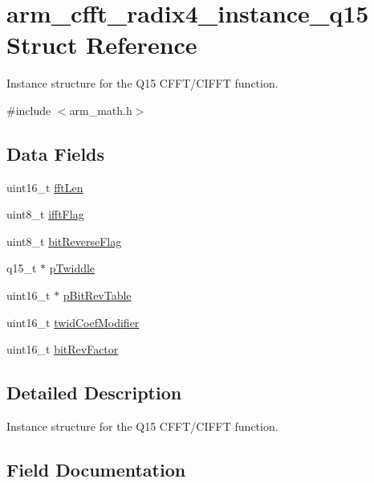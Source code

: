 \hypertarget{structarm__cfft__radix4__instance__q15}{}\section{arm\+\_\+cfft\+\_\+radix4\+\_\+instance\+\_\+q15 Struct Reference}
\label{structarm__cfft__radix4__instance__q15}


Instance structure for the Q15 C\+F\+F\+T/\+C\+I\+F\+FT function.  




{\ttfamily \#include $<$arm\+\_\+math.\+h$>$}

\subsection*{Data Fields}
\begin{DoxyCompactItemize}
\item 
uint16\+\_\+t \hyperlink{structarm__cfft__radix4__instance__q15_ab8db3bbe7c61e6bb8ca2a55e3446e11a}{fft\+Len}
\item 
uint8\+\_\+t \hyperlink{structarm__cfft__radix4__instance__q15_ad6ca6e223f986ebfd94c5ee1e410aa73}{ifft\+Flag}
\item 
uint8\+\_\+t \hyperlink{structarm__cfft__radix4__instance__q15_a09a221a818c6d0e064557a99e2fe9a8b}{bit\+Reverse\+Flag}
\item 
q15\+\_\+t $\ast$ \hyperlink{structarm__cfft__radix4__instance__q15_aa8c837c05b2c910342ab8f171d30dc02}{p\+Twiddle}
\item 
uint16\+\_\+t $\ast$ \hyperlink{structarm__cfft__radix4__instance__q15_a46a2fb328199897af100fea0bfdf59aa}{p\+Bit\+Rev\+Table}
\item 
uint16\+\_\+t \hyperlink{structarm__cfft__radix4__instance__q15_afe772e5b5001c9d8e85032115a8df5bf}{twid\+Coef\+Modifier}
\item 
uint16\+\_\+t \hyperlink{structarm__cfft__radix4__instance__q15_a33386d95319dc3ee7097b3a8e52e01ec}{bit\+Rev\+Factor}
\end{DoxyCompactItemize}


\subsection{Detailed Description}
Instance structure for the Q15 C\+F\+F\+T/\+C\+I\+F\+FT function. 

\subsection{Field Documentation}
\mbox{\label{structarm__cfft__radix4__instance__q15_a09a221a818c6d0e064557a99e2fe9a8b}} 
